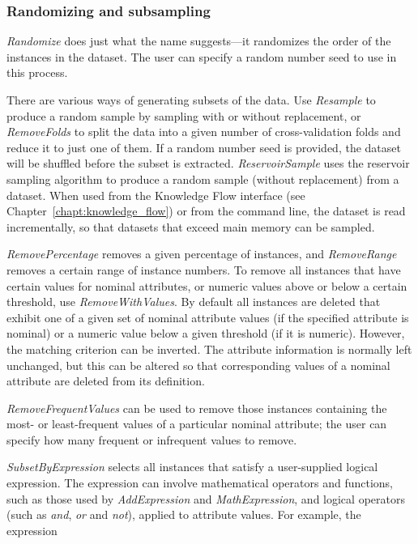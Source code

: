 \subsubsection{Randomizing and subsampling}

\textit{Randomize} does just what the name suggests---it randomizes the
order of the instances in the dataset. The user can specify a random
number seed to use in this process.

There are various ways of generating subsets of the data. Use
\textit{Resample} to produce a random sample by sampling with or
without replacement, or \textit{RemoveFolds} to split the data into a given
number of cross-validation folds and reduce it to just one of them. If
a random number seed is provided, the dataset will be shuffled before
the subset is extracted. \textit{ReservoirSample} uses the reservoir
sampling algorithm to produce a random sample (without replacement)
from a dataset. When used from the Knowledge Flow
interface (see Chapter~\ref{chapt:knowledge_flow}) or from the command line, the
dataset is read incrementally, so that datasets that exceed main
memory can be sampled.

\textit{RemovePercentage} removes a given percentage of instances, and
\textit{RemoveRange} removes a certain range of instance numbers. To
remove all instances that have certain values for nominal attributes,
or numeric values above or below a certain threshold, use
\textit{RemoveWithValues}. By default all instances are deleted that
exhibit one of a given set of nominal attribute values (if the
specified attribute is nominal) or a numeric value below a given
threshold (if it is numeric). However, the matching criterion can be
inverted. The attribute information is normally left unchanged, but
this can be altered so that corresponding values of a nominal
attribute are deleted from its definition.

\textit{RemoveFrequentValues} can be used to remove those instances
containing the most- or least-frequent values of a particular nominal
attribute; the user can specify how many frequent or infrequent values
to remove.

\textit{SubsetByExpression} selects all instances that satisfy a
user-supplied logical expression. The expression can involve
mathematical operators and functions, such as those used by
\textit{AddExpression} and \textit{MathExpression}, and logical
operators (such as \textit{and}, \textit{or} and \textit{not}),
applied to attribute values. For example, the expression\newline

